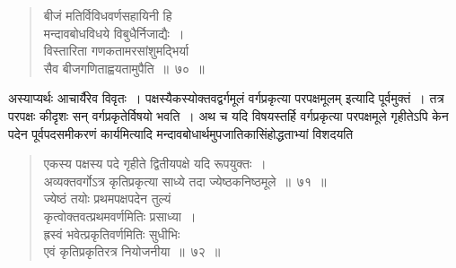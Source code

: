 \documentclass[11pt, openany]{book}
\begin{document}
\afterpage{\fancyhead[RO,LE]{\textbf{\thepage}}}
\cfoot{}
\thispagestyle{empty}
\newpage
\begin{quote}
    \bs
 बीजं मतिर्विविधवर्णसहायिनी हि \\

\vspace{-7mm}
\hspace{1cm} मन्दावबोधविधये विबुधैर्निजाद्यैः~। \\

\vspace{-7mm}
 विस्तारिता गणकतामरसांशुमद्भिर्या \\

\vspace{-7mm}
\hspace{1cm} सैव बीजगणिताह्वयतामुपैति~॥~७०~॥~
\end{quote}

 अस्याप्यर्थः आचार्यैरेव विवृतः~। पक्षस्यैकस्योक्तवद्वर्गमूलं वर्गप्रकृत्या 
परपक्षमूलम् इत्यादि पूर्वमुक्तं~। तत्र परपक्षः कीदृशः सन् वर्गप्रकृतेर्विषयो 
भवति~। अथ च यदि विषयस्तर्हि वर्गप्रकृत्या परपक्षमूले गृहीतेऽपि केन पदेन पूर्वपदसमीकरणं कार्यमित्यादि मन्दावबोधार्थमुपजातिकासिंहोद्धताभ्यां विशदयति\textendash 
\begin{quote}
    \bs
 एकस्य पक्षस्य पदे गृहीते द्वितीयपक्षे यदि रूपयुक्तः~। \\
 अव्यक्तवर्गोऽत्र कृतिप्रकृत्या साध्ये तदा ज्येष्ठकनिष्ठमूले~॥~७१~॥~\\

\vspace{-5mm}
 ज्येष्ठं तयोः प्रथमपक्षपदेन तुल्यं \\

\vspace{-7mm}
\hspace{1cm} कृत्वोक्तवत्प्रथमवर्णमितिः प्रसाध्या~। \\

\vspace{-7mm}
 ह्रस्वं भवेत्प्रकृतिवर्णमितिः सुधीभिः \\

\vspace{-7mm}
\hspace{1cm} एवं कृतिप्रकृतिरत्र नियोजनीया~॥~७२~॥~
\end{quote}
\end{document}

